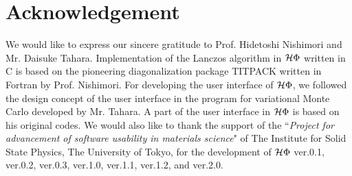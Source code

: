 \chapter{Acknowledgement}
We would like to express our sincere gratitude to Prof. Hidetoshi Nishimori and Mr. Daisuke Tahara.
Implementation of the Lanczos algorithm in $\mathcal{H} \Phi$ written in C is based on the
pioneering diagonalization package TITPACK written in Fortran by Prof. Nishimori.
For developing the user interface of $\mathcal{H} \Phi$, we followed the design concept of
the user interface in the program for variational Monte Carlo developed by Mr. Tahara.
A part of the user interface in $\mathcal{H} \Phi$ is based on his original codes.
We would also like to thank the support of the ``{\it Project for advancement of software usability in materials science}" 
of The Institute for Solid State Physics, The University of Tokyo, for the development of $\mathcal{H} \Phi$ ver.0.1, ver.0.2, ver.0.3, ver.1.0, ver.1.1, ver.1.2, and ver.2.0.
